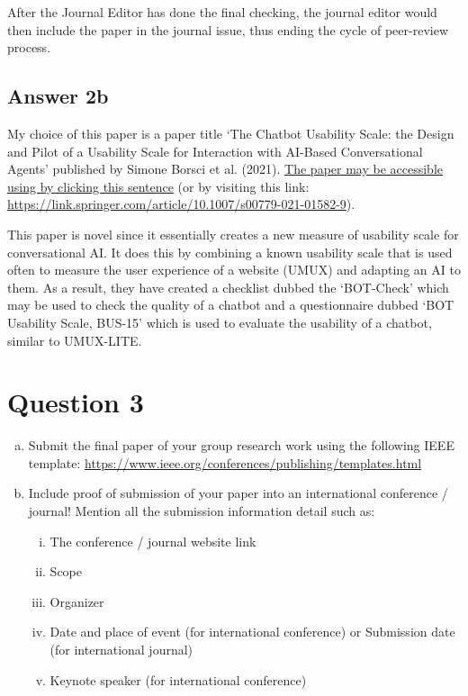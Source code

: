 \documentclass[
  11pt, %
]{assignment}
\begin{document}
After the Journal Editor has done the final checking, the journal editor would then include the paper in the journal issue, thus ending the cycle of peer-review process.


\subsection*{Answer 2b}

My choice of this paper is a paper title `The Chatbot Usability Scale: the Design and Pilot of a Usability Scale for Interaction with AI-Based Conversational Agents' published by Simone Borsci et al. (2021). \href{https://link.springer.com/article/10.1007/s00779-021-01582-9}{The paper may be accessible using by clicking this sentence} (or by visiting this link: \url{https://link.springer.com/article/10.1007/s00779-021-01582-9}).

This paper is novel since it essentially creates a new measure of usability scale for conversational AI\@. It does this by combining a known usability scale that is used often to measure the user experience of a website (UMUX) and adapting an AI to them. As a result, they have created a checklist dubbed the `BOT-Check' which may be used to check the quality of a chatbot and a questionnaire dubbed `BOT Usability Scale, BUS-15' which is used to evaluate the usability of a chatbot, similar to UMUX-LITE\@.

\section*{Question 3}
\begin{problem}
\begin{enumerate}[a.]
  \item Submit the final paper of your group research work using the following IEEE template: \url{https://www.ieee.org/conferences/publishing/templates.html}
  \item Include proof of submission of your paper into an international conference / journal! Mention all the submission information detail such as:
        \begin{enumerate}[i.]
          \item The conference / journal website link
          \item Scope
          \item Organizer
          \item Date and place of event (for international conference) or Submission date (for international journal)
          \item Keynote speaker (for international conference)
        \end{enumerate}
\end{enumerate}
\end{problem}
\end{document}
